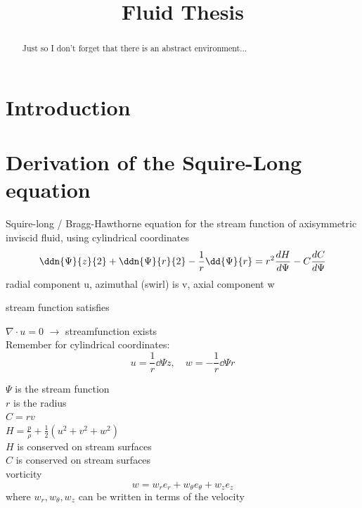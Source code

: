 \documentclass{X:/Documents/Coding/Latex/myreport}
\title{Fluid Thesis}
\begin{document}
\maketitle
\begin{abstract}
    Just so I don't forget that there is an abstract environment...
\end{abstract}
\clearpage
\tableofcontents
\section{Introduction}

\section{Derivation of the Squire-Long equation}
Squire-long / Bragg-Hawthorne equation for the stream function of axisymmetric inviscid fluid, using cylindrical coordinates
\[\ddn{\Psi}{z}{2} + \ddn{\Psi}{r}{2} - \frac1r \dd{\Psi}{r} = r^2 \frac{dH}{d\Psi} - C \frac{dC}{d\Psi}\]
radial component u,  azimuthal (swirl) is v, axial component w

stream function satisfies

$\nabla \cdot u = 0$ $\longrightarrow$ streamfunction exists\\
Remember for cylindrical coordinates:
\[u = \frac1r \dd\Psi{z}, \quad w = -\frac1r \dd\Psi{r} \]

$\Psi$ is the stream function\\
$r$ is the radius\\
$C = rv$\\
$H = \frac{p}{\rho} + \frac12 (u^2 + v^2 + w^2)$ \\
$H$ is conserved on stream surfaces \\
$C$ is conserved on stream surfaces \\

vorticity
\[w = w_re_r + w_\theta e_\theta + w_ze_z\]
where $w_r, w_\theta, w_z$ can be written in terms of the velocity

\newpage
\end{document}
